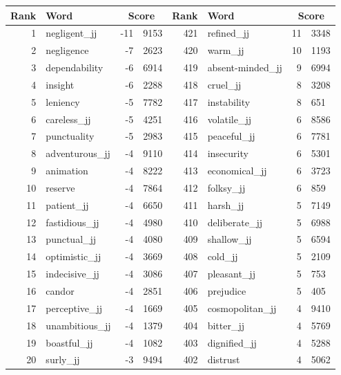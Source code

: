 \begin{table}[tbp]
    \begin{tabular}{| rlr@{.}l | rlr@{.}l |}
    \hline
    \textbf{Rank} & \textbf{Word} & \multicolumn{2}{c|}{\textbf{Score}} & \textbf{Rank} & \textbf{Word} & \multicolumn{2}{c|}{\textbf{Score}} \\
    \hline
    1 & negligent\_jj & -11 & 9153    &    421 & refined\_jj & 11 & 3348 \\
    2 & negligence & -7 & 2623    &    420 & warm\_jj & 10 & 1193 \\
    3 & dependability & -6 & 6914    &    419 & absent-minded\_jj & 9 & 6994 \\
    4 & insight & -6 & 2288    &    418 & cruel\_jj & 8 & 3208 \\
    5 & leniency & -5 & 7782    &    417 & instability & 8 & 651 \\
    6 & careless\_jj & -5 & 4251    &    416 & volatile\_jj & 6 & 8586 \\
    7 & punctuality & -5 & 2983    &    415 & peaceful\_jj & 6 & 7781 \\
    8 & adventurous\_jj & -4 & 9110    &    414 & insecurity & 6 & 5301 \\
    9 & animation & -4 & 8222    &    413 & economical\_jj & 6 & 3723 \\
    10 & reserve & -4 & 7864    &    412 & folksy\_jj & 6 & 859 \\
    11 & patient\_jj & -4 & 6650    &    411 & harsh\_jj & 5 & 7149 \\
    12 & fastidious\_jj & -4 & 4980    &    410 & deliberate\_jj & 5 & 6988 \\
    13 & punctual\_jj & -4 & 4080    &    409 & shallow\_jj & 5 & 6594 \\
    14 & optimistic\_jj & -4 & 3669    &    408 & cold\_jj & 5 & 2109 \\
    15 & indecisive\_jj & -4 & 3086    &    407 & pleasant\_jj & 5 & 753 \\
    16 & candor & -4 & 2851    &    406 & prejudice & 5 & 405 \\
    17 & perceptive\_jj & -4 & 1669    &    405 & cosmopolitan\_jj & 4 & 9410 \\
    18 & unambitious\_jj & -4 & 1379    &    404 & bitter\_jj & 4 & 5769 \\
    19 & boastful\_jj & -4 & 1082    &    403 & dignified\_jj & 4 & 5288 \\
    20 & surly\_jj & -3 & 9494    &    402 & distrust & 4 & 5062 \\

\end{tabular}
\end{table}
